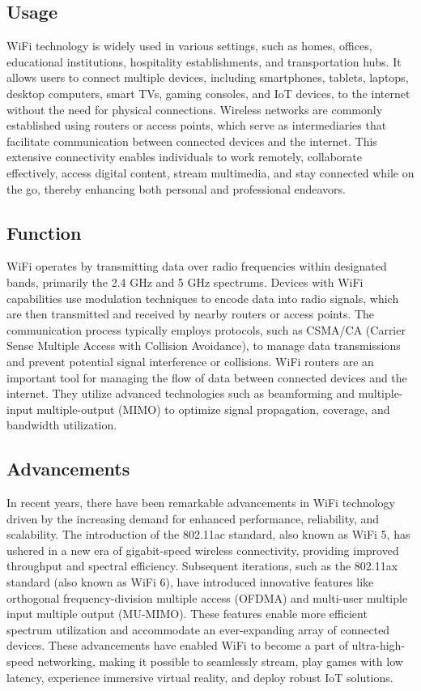 \subsection{Usage}
WiFi technology is widely used in various settings, such as homes, offices, educational institutions, hospitality establishments, and transportation hubs. It allows users to connect multiple devices, including smartphones, tablets, laptops, desktop computers, smart TVs, gaming consoles, and IoT devices, to the internet without the need for physical connections. Wireless networks are commonly established using routers or access points, which serve as intermediaries that facilitate communication between connected devices and the internet. This extensive connectivity enables individuals to work remotely, collaborate effectively, access digital content, stream multimedia, and stay connected while on the go, thereby enhancing both personal and professional endeavors.

\subsection{Function}
WiFi operates by transmitting data over radio frequencies within designated bands, primarily the 2.4 GHz and 5 GHz spectrums. Devices with WiFi capabilities use modulation techniques to encode data into radio signals, which are then transmitted and received by nearby routers or access points. The communication process typically employs protocols, such as CSMA/CA (Carrier Sense Multiple Access with Collision Avoidance), to manage data transmissions and prevent potential signal interference or collisions. WiFi routers are an important tool for managing the flow of data between connected devices and the internet. They utilize advanced technologies such as beamforming and multiple-input multiple-output (MIMO) to optimize signal propagation, coverage, and bandwidth utilization.

\subsection{Advancements}
In recent years, there have been remarkable advancements in WiFi technology driven by the increasing demand for enhanced performance, reliability, and scalability. The introduction of the 802.11ac standard, also known as WiFi 5, has ushered in a new era of gigabit-speed wireless connectivity, providing improved throughput and spectral efficiency. Subsequent iterations, such as the 802.11ax standard (also known as WiFi 6), have introduced innovative features like orthogonal frequency-division multiple access (OFDMA) and multi-user multiple input multiple output (MU-MIMO). These features enable more efficient spectrum utilization and accommodate an ever-expanding array of connected devices. These advancements have enabled WiFi to become a part of ultra-high-speed networking, making it possible to seamlessly stream, play games with low latency, experience immersive virtual reality, and deploy robust IoT solutions.

